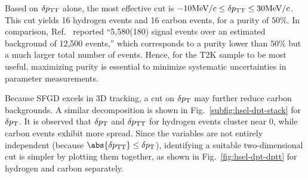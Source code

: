      Based on $\delta p_\textrm{TT}$ alone, the most effective cut is $-10\textrm{MeV}/c \leq \delta p_\textrm{TT} \leq 30\textrm{MeV}/c$.
     This cut yields 16 hydrogen events and 16 carbon events, for a purity of $50\%$.
     In comparison, Ref.~\cite{MINERvA:2023avz} reported ``5,580(180) signal events over an estimated background of 12,500 events,'' which corresponds to a purity lower than $50\%$ but a much larger total number of events.
     Hence, for the T2K sample to be most useful, maximizing purity is essential to minimize systematic uncertainties in parameter measurements.

     Because SFGD excels in 3D tracking, a cut on $\delta p_\textrm{T}$ may further reduce carbon backgrounds.
     A similar decomposition is shown in Fig.~\ref{subfig:hsel-dpt-stack} for $\delta p_\textrm{T}$.
     It is observed that $\delta p_\textrm{T}$ and $\delta p_\textrm{TT}$ for hydrogen events cluster near $0$, while carbon events exhibit more spread.
     Since the variables are not entirely independent (because $\abs{\dptt} \leq \dpt$), identifying a suitable two-dimensional cut is simpler by plotting them together, as shown in Fig.~\ref{fig:hsel-dpt-dptt} for hydrogen and carbon separately.
